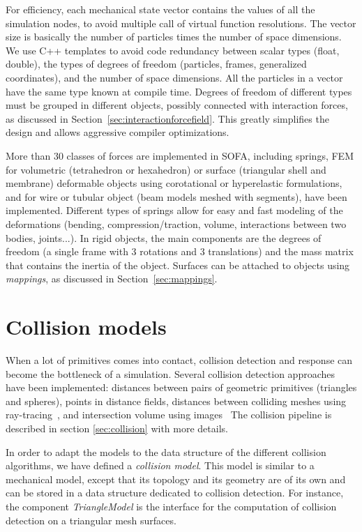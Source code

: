 For efficiency, each mechanical state vector contains the values of all the simulation nodes, to avoid multiple call of virtual function resolutions.
The vector size is basically the number of particles times the number of space dimensions. 
We use C++ templates to avoid code redundancy between scalar types (float, double), the types of degrees of freedom (particles, frames, generalized coordinates), and the number of space dimensions.
All the particles in a vector have the same type known at compile time.
Degrees of freedom of different types must be grouped in different objects, possibly connected with interaction forces, as discussed in Section~\ref{sec:interactionforcefield}.
This greatly simplifies the design and allows aggressive compiler optimizations.

More than 30 classes of forces are implemented in SOFA, including springs, FEM for volumetric (tetrahedron or hexahedron) or surface (triangular shell and membrane) deformable objects using corotational or hyperelastic formulations, and for wire or tubular object (beam models meshed with segments), have been implemented.
Different types of springs allow for easy and fast modeling of the deformations (bending, compression/traction, volume, interactions between two bodies, joints...).
In rigid objects, the main components are the degrees of freedom (a single frame with 3 rotations and 3 translations) and the mass matrix that contains the inertia of the object. 
Surfaces can be attached to objects using \textit{mappings}, as discussed in Section~\ref{sec:mappings}.


\section{Collision models} \label{sec:collisionModels}
When a lot of primitives comes into contact, collision detection and response can become the bottleneck of a simulation. 
Several collision detection approaches have been implemented: distances between pairs of geometric primitives (triangles and spheres), points in distance fields, distances between colliding meshes using ray-tracing~\cite{HerFauRaf08}, and intersection volume using images~\cite{AFCFDK10}
The collision pipeline is described in section \ref{sec:collision} with more details. 

In order to adapt the models to the data structure of the different collision algorithms, we have defined a \textit{collision model}.
This model is similar to a mechanical model, except that its topology and its geometry are of its own and can be  stored in a data structure dedicated to collision detection. 
For instance, the component \textit{TriangleModel} is the interface for the computation of collision detection on a triangular mesh surfaces.

